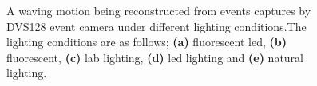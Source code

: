 \begin{figure}[htb]%
    \centering
    \qquad
    \qquad
    \qquad
    \qquad
    \caption{A waving motion being reconstructed from events captures by DVS128 event camera under different lighting conditions.The lighting conditions are as follows; \textbf{(a)} fluorescent led, \textbf{(b)} fluorescent, \textbf{(c)} lab lighting, \textbf{(d)} led lighting and \textbf{(e)} natural lighting.}%
    \label{fig:wave_in_lightings_reconstructions}%
\end{figure}

